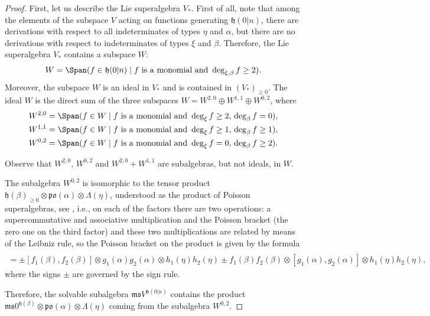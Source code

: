 \documentclass[10pt,a4paper]{amsart}
\newcommand {\fh} {{\mathfrak{h}}}
\newcommand {\fm} {{\mathfrak{m}}}
\newcommand {\fpo} {{\mathfrak{po}}}
\newcommand {\fs} {{\mathfrak{s}}}
\newcommand {\<} [2] {{\left.\vphantom{#2}\right.^{#1\!}\!{#2}}}
\numberwithin{equation}{section}
\begin{document}
\begin{proof} First, let us describe the Lie superalgebra $V_*$. First of all, note that among the elements of the subspace $V$ acting on functions generating $\fh(0|n)$, there are derivations with respect to all indeterminates of types $\eta$ and $\alpha$, but there are no derivations with respect to indeterminates of types $\xi$ and $\beta$. Therefore, the Lie superalgebra $V_*$ contains a subspace $W$:
\[
W=\Span(f\in \fh(0|n)\mid f   \ \text{is a monomial and} \ \deg_{\xi,\beta}f\ge 2).
\]
Moreover, the subspace $W$ is an ideal in $V_*$ and is contained in $(V_*)_{\ge 0}$. The ideal $W$ is the direct sum of the three subspaces $W=W^{2,0}\oplus W^{1,1}\oplus W^{0,2}$, where
\begin{gather*}
W^{2,0}=\Span(f\in W\mid f\   \text{is a monomial and}\   \deg_\xi f\ge 2,\, \deg_\beta f=0),\\
W^{1,1}=\Span(f\in W\mid f \   \text{is a monomial and}\  \deg_\xi f\ge 1, \,\deg_\beta f\ge 1),\\
W^{0,2}=\Span(f\in W\mid f\   \text{is a monomial and}\   \deg_\xi f=0,\, \deg_\beta f\ge 2).
\end{gather*}

Observe that $W^{2, 0}$, $W^{0,2}$ and $W^{2,0}+W^{1,1}$ are subalgebras, but not ideals, in $W$.

The subalgebra $W^{0,2}$ is isomorphic to the tensor product $\fh(\beta)_{\ge 0}\otimes \fpo(\alpha) \otimes \Lambda(\eta)$, understood as the product of Poisson superalgebras, see \cite{Z}, i.e., on each of the factors there are two operations: a supercommutative and associative multiplication and the Poisson bracket (the zero one on the third factor) and these two multiplications are related by means of the Leibniz rule, so the Poisson bracket on the product is given by the formula{\samepage
\begin{gather*}
[f_1(\beta)\otimes g_1(\alpha)\otimes h_1(\eta),   f_2(\beta)\otimes g_2(\alpha)\otimes h_2(\eta)]\\
=
\pm [f_1(\beta),f_2(\beta)]\otimes g_1(\alpha)g_2(\alpha)\otimes h_1(\eta)h_2(\eta) \pm f_1(\beta)f_2(\beta)\otimes[g_1(\alpha), g_2(\alpha)]\otimes h_1(\eta)h_2(\eta),
\end{gather*}
where the signs $\pm$ are governed by the sign rule.}

Therefore, the solvable subalgebra $\fm\fs V^{\fh(0|n)}$ contains the product $\fm\fs 0^{\fh(\beta)}\otimes \fpo(\alpha)\otimes \Lambda(\eta)$ coming from the subalgebra $W^{0,2}$.


\end{proof}
\end{document}

